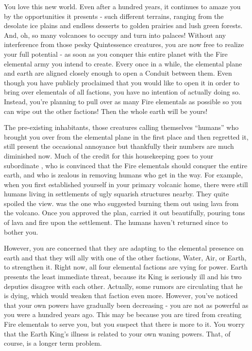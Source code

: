 \documentclass[char]{elementals}
\begin{document}
\name{\cQueen{}}

You love this new world.  Even after a hundred years, it continues to amaze you by the opportunities it presents - such different terrains, ranging from the desolate ice plains and endless desserts to golden prairies and lush green forests.  And, oh, so many volcanoes to occupy and turn into palaces!  Without any interference from those pesky Quintessence creatures, you are now free to realize your full potential - as soon as you conquer this entire planet with the Fire elemental army you intend to create.  Every once in a while, the elemental plane and earth are aligned closely enough to open a Conduit between them.  Even though you have publicly proclaimed that you would like to open it in order to bring over elementals of all factions, you have no intention of actually doing so.  Instead, you're planning to pull over as many Fire elementals as possible so you can wipe out the other factions!  Then the whole earth will be yours!

The pre-existing inhabitants, those creatures calling themselves ``humans'' who brought you over from the elemental plane in the first place and then regretted it, still present the occasional annoyance but thankfully their numbers are much diminished now.  Much of the credit for this housekeeping goes to your subordinate \cPyro{\intro}, who is convinced that the Fire elementals should conquer the entire earth, and who is zealous in removing humans who get in the way.  For example, when you first established yourself in your primary volcanic home, there were still humans living in settlements of ugly squarish structures nearby.  They quite spoiled the view.  \cPyro{} was the one who suggested burning them out using lava from the volcano.  Once you approved the plan, \cPyro{\they} carried it out beautifully, pouring tons of lava and fire upon the settlement.  The humans haven't returned since to bother you.

However, you are concerned that they are adapting to the elemental presence on earth and that they will ally with one of the other factions, Water, Air, or Earth, to strengthen it.  Right now, all four elemental factions are vying for power.  Earth presents the least immediate threat, because its King is seriously ill and his two deputies disagree with each other.  Actually, some rumors are circulating that he is dying, which would weaken that faction even more.  However, you've noticed that your own powers have gradually been decreasing - you are not as powerful as you were a hundred years ago.  This may be because you are tired from creating Fire elementals to serve you, but you suspect that there is more to it.  You worry that the Earth King's illness is related to your own waning powers.  That, of course, is a longer term problem.
\end{document}
